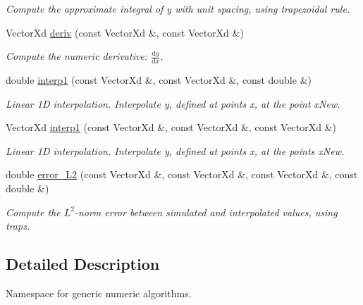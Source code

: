 \begin{DoxyCompactItemize}
\begin{DoxyCompactList}\small\item\em Compute the approximate integral of {\itshape y} with unit spacing, using trapezoidal rule. \end{DoxyCompactList}\item 
Vector\-Xd \hyperlink{namespacenumerics_a902afe79eec526f73e070726d858c368}{deriv} (const Vector\-Xd \&, const Vector\-Xd \&)
\begin{DoxyCompactList}\small\item\em Compute the numeric derivative\-: $ \frac{\mathrm{d}y}{\mathrm{d}x} $. \end{DoxyCompactList}\item 
double \hyperlink{namespacenumerics_a4e1271b4748935d7f4889fc1bdf5117b}{interp1} (const Vector\-Xd \&, const Vector\-Xd \&, const double \&)
\begin{DoxyCompactList}\small\item\em Linear 1\-D interpolation. Interpolate {\itshape y}, defined at points {\itshape x}, at the point {\itshape x\-New}. \end{DoxyCompactList}\item 
Vector\-Xd \hyperlink{namespacenumerics_af30101e79ffdfd4dae00b864e3514ac7}{interp1} (const Vector\-Xd \&, const Vector\-Xd \&, const Vector\-Xd \&)
\begin{DoxyCompactList}\small\item\em Linear 1\-D interpolation. Interpolate {\itshape y}, defined at points {\itshape x}, at the points {\itshape x\-New}. \end{DoxyCompactList}\item 
double \hyperlink{namespacenumerics_ad636dd100e7ebe7b1e83868001e9d55a}{error\-\_\-\-L2} (const Vector\-Xd \&, const Vector\-Xd \&, const Vector\-Xd \&, const double \&)
\begin{DoxyCompactList}\small\item\em Compute the $ L^2 $-\/norm error between simulated and interpolated values, using {\itshape trapz}. \end{DoxyCompactList}\end{DoxyCompactItemize}


\subsection{Detailed Description}
Namespace for generic numeric algorithms. 

